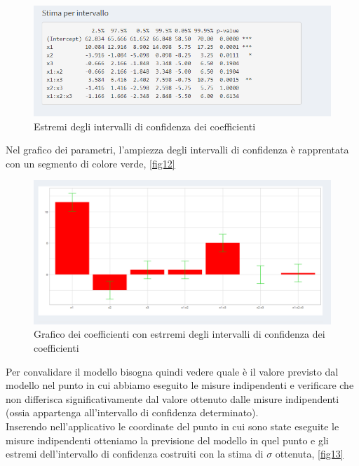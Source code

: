 \documentclass[
]{book}
\begin{document}
\begin{figure}

{\centering \includegraphics[width=1\linewidth]{Immagini/11_intconf} 

}

\caption{Estremi degli intervalli di confidenza dei coefficienti \label{fig11}}\label{fig:unnamed-chunk-15}
\end{figure}

Nel grafico dei parametri, l'ampiezza degli intervalli di confidenza è rapprentata con un segmento di colore verde, \autoref{fig12}

\begin{figure}

{\centering \includegraphics[width=1\linewidth]{Immagini/12_intcong_graf} 

}

\caption{Grafico dei coefficienti con estrremi degli intervalli di confidenza dei coefficienti \label{fig12}}\label{fig:unnamed-chunk-16}
\end{figure}

Per convalidare il modello bisogna quindi vedere quale è il valore previsto dal modello nel punto in cui abbiamo eseguito le misure indipendenti e verificare che non differisca significativamente dal valore ottenuto dalle misure indipendenti (ossia appartenga all'intervallo di confidenza determinato).\\
Inserendo nell'applicativo le coordinate del punto in cui sono state eseguite le misure indipendenti otteniamo la previsione del modello in quel punto e gli estremi dell'intervallo di confidenza costruiti con la stima di \(\sigma\) ottenuta, \autoref{fig13}
\end{document}
